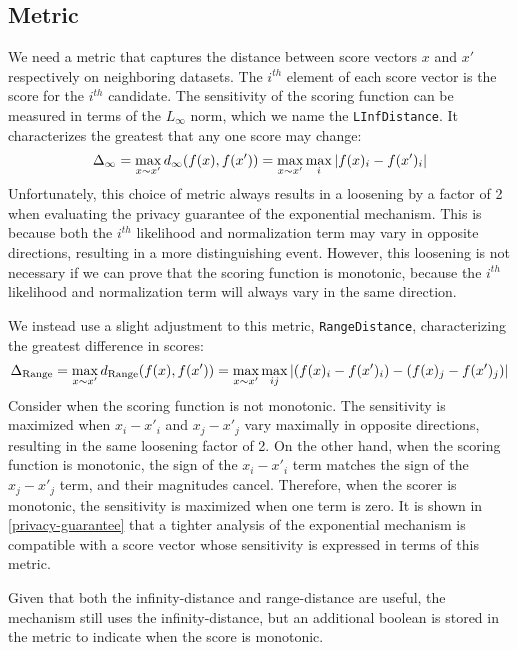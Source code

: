 \documentclass{article}
\begin{document}
\subsection{Metric}
We need a metric that captures the distance between score vectors $x$ and $x'$ respectively on neighboring datasets.
The $i^{th}$ element of each score vector is the score for the $i^{th}$ candidate.
The sensitivity of the scoring function can be measured in terms of the $L_\infty$ norm, which we name the \texttt{LInfDistance}.
It characterizes the greatest that any one score may change:
\begin{equation}
    \Delta_{\infty} = \max_{x \sim x'} d_{\infty}(f(x), f(x')) = \max_{x \sim x'} \max_i \abs{f(x)_i - f(x')_i}
\end{equation}
Unfortunately, this choice of metric always results in a loosening by a factor of 2 when evaluating the privacy guarantee of the exponential mechanism.
This is because both the $i^{th}$ likelihood and normalization term may vary in opposite directions, resulting in a more distinguishing event.
However, this loosening is not necessary if we can prove that the scoring function is monotonic, because the $i^{th}$ likelihood and normalization term will always vary in the same direction.

We instead use a slight adjustment to this metric, \texttt{RangeDistance}, characterizing the greatest difference in scores:
\begin{equation}
    \Delta_{\text{Range}} = \max_{x \sim x'} d_{\text{Range}}(f(x), f(x')) = \max_{x \sim x'} \max_{ij} \abs{(f(x)_i - f(x')_i) - (f(x)_j - f(x')_j)}
\end{equation}
Consider when the scoring function is not monotonic.
The sensitivity is maximized when $x_i - x'_i$ and $x_j - x'_j$ vary maximally in opposite directions, resulting in the same loosening factor of 2.
On the other hand, when the scoring function is monotonic, the sign of the $x_i - x'_i$ term matches the sign of the $x_j - x'_j$ term,
and their magnitudes cancel.
Therefore, when the scorer is monotonic, the sensitivity is maximized when one term is zero.
It is shown in \ref{privacy-guarantee} that a tighter analysis of the exponential mechanism is compatible with a score vector whose sensitivity is expressed in terms of this metric.

Given that both the infinity-distance and range-distance are useful, the mechanism still uses the infinity-distance,
but an additional boolean is stored in the metric to indicate when the score is monotonic.
\end{document}
